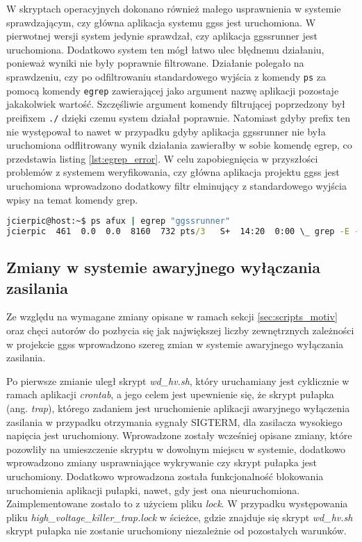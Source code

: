 W skryptach operacyjnych dokonano również małego usprawnienia w systemie sprawdzającym, czy główna aplikacja systemu ggss jest uruchomiona. W pierwotnej wersji system jedynie sprawdzał, czy aplikacja ggssrunner jest uruchomiona. Dodatkowo system ten mógł łatwo ulec błędnemu działaniu, ponieważ wyniki nie były poprawnie filtrowane. Działanie polegało na sprawdzeniu, czy po odfiltrowaniu standardowego wyjścia z komendy \lstinline{ps} za pomocą komendy \lstinline{egrep} zawierającej jako argument nazwę aplikacji pozostaje jakakolwiek wartość. Szczęśliwie argument komendy filtrującej poprzedzony był preifixem \lstinline{./} dzięki czemu system działał poprawnie. Natomiast gdyby prefix ten nie występował to nawet w przypadku gdyby aplikacja ggssrunner nie była uruchomiona odflitrowany wynik działania zawierałby w sobie komendę egrep, co przedstawia listing \ref{lst:egrep_error}. W celu zapobiegnięcia w przyszłości problemów z systemem weryfikowania, czy główna aplikacja projektu ggss jest uruchomiona wprowadzono dodatkowy filtr elminujący z standardowego wyjścia wpisy na temat komendy grep.

\begin{lstlisting}[language=cmd,caption={Przykładowe działanie połączenie komend ps oraz egrep bez prefixu \lstinline{./} przy argumencie komendy egrep.},label={lst:egrep_error},frame=single]
jcierpic@host:~$ ps afux | egrep "ggssrunner"
jcierpic  461  0.0  0.0  8160  732 pts/3   S+  14:20  0:00 \_ grep -E --color=auto ggssrunner
\end{lstlisting}

\subsection{Zmiany w systemie awaryjnego wyłączania zasilania}

Ze względu na wymagane zmiany opisane w ramach sekcji \ref{sec:scripts_motiv} oraz chęci autorów do pozbycia się jak największej liczby zewnętrznych zależności w projekcie ggss wprowadzono szereg zmian w systemie awaryjnego wyłączania zasilania.

Po pierwsze zmianie uległ skrypt \emph{wd\_hv.sh}, który uruchamiany jest cyklicznie w ramach aplikacji \emph{crontab}, a jego celem jest upewnienie się, że skrypt pułapka (ang. \emph{trap}), którego zadaniem jest uruchomienie aplikacji awaryjnego wyłączenia zasilania w przypadku otrzymania sygnały SIGTERM, dla zasilacza wysokiego napięcia jest uruchomiony. Wprowadzone zostały wcześniej opisane zmiany, które pozowliły na umieszczenie skryptu w dowolnym miejscu w systemie, dodatkowo wprowadzono zmiany usprawniające wykrywanie czy skrypt pułapka jest uruchomiony. Dodatkowo wprowadzona została funkcjonalność blokowania uruchomienia aplikacji pułapki, nawet, gdy jest ona nieuruchomiona. Zaimplementowane zostało to z użyciem pliku \emph{lock}. W przypadku występowania pliku \emph{high\_voltage\_killer\_trap.lock} w ścieżce, gdzie znajduje się skrypt \emph{wd\_hv.sh} skrypt pułapka nie zostanie uruchomiony niezależnie od pozostałych warunków.

